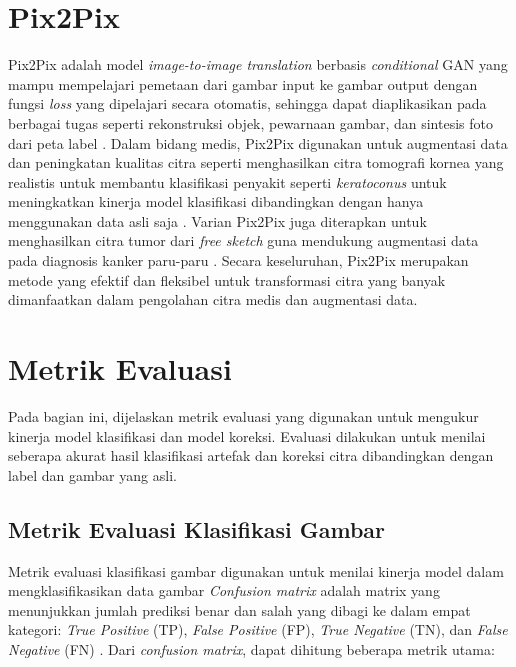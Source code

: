 \section{Pix2Pix}

Pix2Pix adalah model \textit{image-to-image translation} berbasis \textit{conditional} GAN yang mampu mempelajari pemetaan dari gambar input ke gambar output dengan fungsi \textit{loss} yang dipelajari secara otomatis, sehingga dapat diaplikasikan pada berbagai tugas seperti rekonstruksi objek, pewarnaan gambar, dan sintesis foto dari peta label \citep{Isola2018}. Dalam bidang medis, Pix2Pix digunakan untuk augmentasi data dan peningkatan kualitas citra seperti menghasilkan citra tomografi kornea yang realistis untuk membantu klasifikasi penyakit seperti \textit{keratoconus} untuk meningkatkan kinerja model klasifikasi dibandingkan dengan hanya menggunakan data asli saja \citep{Abdelmotaal2021}. Varian Pix2Pix juga diterapkan untuk menghasilkan citra tumor dari \textit{free sketch} guna mendukung augmentasi data pada diagnosis kanker paru-paru \citep{Toda2022}. Secara keseluruhan, Pix2Pix merupakan metode yang efektif dan fleksibel untuk transformasi citra yang banyak dimanfaatkan dalam pengolahan citra medis dan augmentasi data.

\section{Metrik Evaluasi}

Pada bagian ini, dijelaskan metrik evaluasi yang digunakan untuk mengukur kinerja model klasifikasi dan model koreksi. Evaluasi dilakukan untuk menilai seberapa akurat hasil klasifikasi artefak dan koreksi citra dibandingkan dengan label dan gambar yang asli.

\subsection{Metrik Evaluasi Klasifikasi Gambar}

Metrik evaluasi klasifikasi gambar digunakan untuk menilai kinerja model dalam mengklasifikasikan data gambar \textit{Confusion matrix} adalah matrix yang menunjukkan jumlah prediksi benar dan salah yang dibagi ke dalam empat kategori: \textit{True Positive} (TP), \textit{False Positive} (FP), \textit{True Negative} (TN), dan \textit{False Negative} (FN) \citep{JudeChukwuraObi2023}. Dari \textit{confusion matrix}, dapat dihitung beberapa metrik utama:

